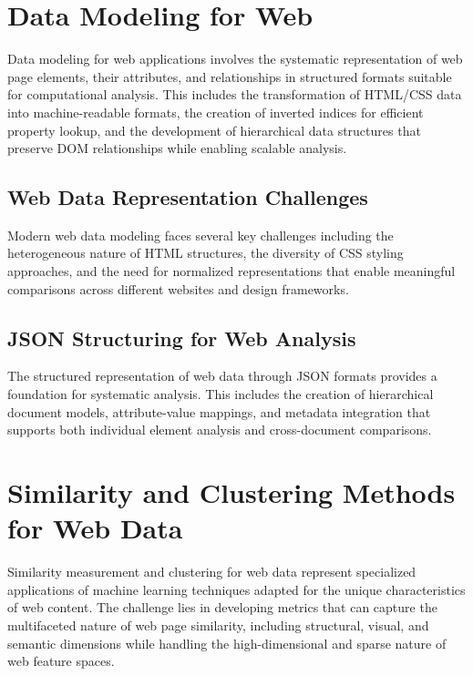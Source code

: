 \section{Data Modeling for Web}
\label{sec:data-modeling-theory}

Data modeling for web applications involves the systematic representation of web page elements, their attributes, and relationships in structured formats suitable for computational analysis. This includes the transformation of HTML/CSS data into machine-readable formats, the creation of inverted indices for efficient property lookup, and the development of hierarchical data structures that preserve DOM relationships while enabling scalable analysis.

\subsection{Web Data Representation Challenges}

Modern web data modeling faces several key challenges including the heterogeneous nature of HTML structures, the diversity of CSS styling approaches, and the need for normalized representations that enable meaningful comparisons across different websites and design frameworks.

\subsection{JSON Structuring for Web Analysis}

The structured representation of web data through JSON formats provides a foundation for systematic analysis. This includes the creation of hierarchical document models, attribute-value mappings, and metadata integration that supports both individual element analysis and cross-document comparisons.

\section{Similarity and Clustering Methods for Web Data}
\label{sec:similarity-clustering-theory}

Similarity measurement and clustering for web data represent specialized applications of machine learning techniques adapted for the unique characteristics of web content. The challenge lies in developing metrics that can capture the multifaceted nature of web page similarity, including structural, visual, and semantic dimensions while handling the high-dimensional and sparse nature of web feature spaces.

